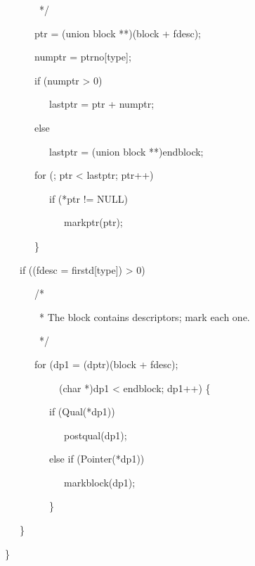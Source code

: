 {\ttfamily\mdseries
\ \ \ \ \ \ \ \ \ \ \ \ \ */
}

{\ttfamily\mdseries
\ \ \ \ \ \ \ \ \ \ \ \ ptr = (union block **)(block + fdesc);
}

{\ttfamily\mdseries
\ \ \ \ \ \ \ \ \ \ \ \ numptr = ptrno[type];
}

{\ttfamily\mdseries
\ \ \ \ \ \ \ \ \ \ \ \ if (numptr {\textgreater} 0)
}

{\ttfamily\mdseries
\ \ \ \ \ \ \ \ \ \ \ \ \ \ \ lastptr = ptr + numptr;
}

{\ttfamily\mdseries
\ \ \ \ \ \ \ \ \ \ \ \ else
}

{\ttfamily\mdseries
\ \ \ \ \ \ \ \ \ \ \ \ \ \ \ lastptr = (union block **)endblock;
}

{\ttfamily\mdseries
\ \ \ \ \ \ \ \ \ \ \ \ for (; ptr {\textless} lastptr; ptr++)
}

{\ttfamily\mdseries
\ \ \ \ \ \ \ \ \ \ \ \ \ \ \ if (*ptr != NULL)
}

{\ttfamily\mdseries
\ \ \ \ \ \ \ \ \ \ \ \ \ \ \ \ \ \ markptr(ptr);
}

{\ttfamily\mdseries
\ \ \ \ \ \ \ \ \ \ \ \ \}
}

{\ttfamily\mdseries
\ \ \ \ \ \ \ \ \ if ((fdesc = firstd[type]) {\textgreater} 0)
}

{\ttfamily\mdseries
\ \ \ \ \ \ \ \ \ \ \ \ /*
}

{\ttfamily\mdseries
\ \ \ \ \ \ \ \ \ \ \ \ \ * The block contains descriptors; mark each one. }

{\ttfamily\mdseries
\ \ \ \ \ \ \ \ \ \ \ \ \ */
}

{\ttfamily\mdseries
\ \ \ \ \ \ \ \ \ \ \ \ for (dp1 = (dptr)(block + fdesc);
}

{\ttfamily\mdseries
\ \ \ \ \ \ \ \ \ \ \ \ \ \ \ \ \ (char *)dp1 {\textless} endblock; dp1++) \{
}

{\ttfamily\mdseries
\ \ \ \ \ \ \ \ \ \ \ \ \ \ \ if (Qual(*dp1))
}

{\ttfamily\mdseries
\ \ \ \ \ \ \ \ \ \ \ \ \ \ \ \ \ \ postqual(dp1);
}

{\ttfamily\mdseries
\ \ \ \ \ \ \ \ \ \ \ \ \ \ \ else if (Pointer(*dp1))
}

{\ttfamily\mdseries
\ \ \ \ \ \ \ \ \ \ \ \ \ \ \ \ \ \ markblock(dp1);
}

{\ttfamily\mdseries
\ \ \ \ \ \ \ \ \ \ \ \ \ \ \ \}
}

{\ttfamily\mdseries
\ \ \ \ \ \ \ \ \ \}
}

{\ttfamily\mdseries
\ \ \ \ \ \ \} }


